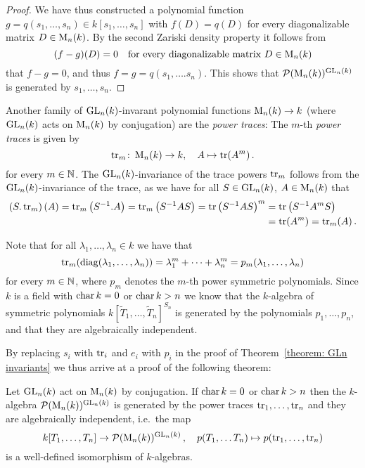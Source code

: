 \begin{proof}
  We have thus constructed a polynomial function $g = q(s_1, \dotsc, s_n) \in k[s_1, \dotsc, s_n]$ with $f(D) = q(D)$ for every diagonalizable matrix $D \in \operatorname{M}_n(k)$.
  By the second Zariski density property it follows from
  \[
    (f - g)(D) = 0
    \quad
    \text{for every diagonalizable matrix $D \in \operatorname{M}_n(k)$}
  \]
  that $f - g = 0$, and thus $f = g = q(s_1, \dotsc. s_n)$.
  This shows that $\mathcal{P}(\operatorname{M}_n(k))^{\operatorname{GL}_n(k)}$ is generated by $s_1, \dotsc, s_n$.
\end{proof}


\begin{fluff}
  Another family of $\operatorname{GL}_n(k)$-invarant polynomial functions $\operatorname{M}_n(k) \to k$ (where $\operatorname{GL}_n(k)$ acts on $\operatorname{M}_n(k)$ by conjugation) are the \emph{power traces}:
  The $m$-th \emph{power traces} is given by
  \[
            \operatorname{tr}_m
    \colon  \operatorname{M}_n(k)
    \to     k,
    \quad    A
    \mapsto \operatorname{tr}(A^m)  \,.
  \]
  for every $m \in \mathbb{N}$.
  The $\operatorname{GL}_n(k)$-invariance of the trace powers $\operatorname{tr}_m$ follows from the $\operatorname{GL}_n(k)$-invariance of the trace, as we have for all $S \in \operatorname{GL}_n(k)$, $A \in \operatorname{M}_n(k)$ that
    \begin{align*}
        \left( S.\operatorname{tr}_m \right)(A)
     =  \operatorname{tr}_m\left( S^{-1}.A \right)
     =  \operatorname{tr}_m\left( S^{-1} A S \right)
     =  \operatorname{tr} \left( S^{-1} A S \right)^m
    &=  \operatorname{tr} \left( S^{-1} A^m S \right) \\
    &=  \operatorname{tr}(A^m)
     =  \operatorname{tr}_m(A) \,.
  \end{align*}
  
  Note that for all $\lambda_1, \dotsc, \lambda_n \in k$ we have that
  \[
      \operatorname{tr}_m(\operatorname{diag}(\lambda_1, \dotsc, \lambda_n))
    = \lambda_1^m + \dotsb + \lambda_n^m
    = p_m(\lambda_1, \dotsc, \lambda_n)
  \]
  for every $m \in \mathbb{N}$, where $p_m$ denotes the $m$-th power symmetric polynomials.
  Since $k$ is a field with $\operatorname{char} k = 0$ or $\operatorname{char} k > n$ we know that the $k$-algebra of symmetric polynomials $k[\tilde{T}_1, \dotsc, \tilde{T}_n]^{S_n}$ is generated by the polynomials $p_1, \dotsc, p_n$, and that they are algebraically independent.
  
  By replacing $s_i$ with $\operatorname{tr}_i$ and $e_i$ with $p_i$ in the proof of Theorem~\ref{theorem: GLn invariants} we thus arrive at a proof of the following theorem:
\end{fluff}


\begin{theorem}
  Let $\operatorname{GL}_n(k)$ act on $\operatorname{M}_n(k)$ by conjugation.
  If $\operatorname{char} k = 0$ or $\operatorname{char} k > n$ then the $k$-algebra $\mathcal{P}(\operatorname{M}_n(k))^{\operatorname{GL}_n(k)}$ is generated by the power traces $\operatorname{tr}_1, \dotsc, \operatorname{tr}_n$ and they are algebraically independent, i.e.\ the map
   \[
            k[T_1, \dotsc, T_n]
    \to     \mathcal{P}(\operatorname{M}_n(k))^{\operatorname{GL}_n(k)} \,,
    \quad   p(T_1, \dotsc T_n)
    \mapsto p(\operatorname{tr}_1, \dotsc, \operatorname{tr}_n)
  \]
  is a well-defined isomorphism of $k$-algebras.
\end{theorem}
